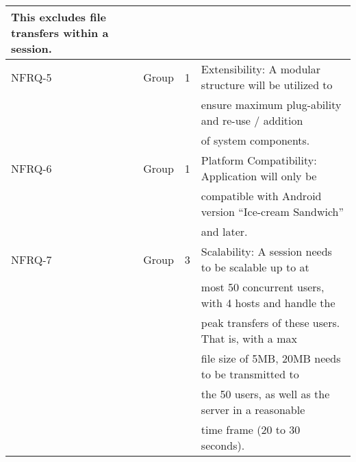 \documentclass[12pt]{article}
\begin{document}
\begin{center}
\begin{tabular}[h]{|l|l|l|l|}
					 This excludes file transfers within a session. \\
\hline
NFRQ-5 & Group & 1 & Extensibility: A modular structure will be utilized to\\ & & & 
					 ensure maximum plug-ability and re-use / addition \\ & & & 
					 of system components. \\
\hline
NFRQ-6 & Group & 1 & Platform Compatibility: Application will only be\\ & & & 
					 compatible with Android version “Ice-cream Sandwich”\\ & & & 
					  and later. \\
\hline
NFRQ-7 & Group & 3 & Scalability: A session needs to be scalable up to at \\ & & & 
					most 50 concurrent users, with 4 hosts and handle the \\ & & & 
					peak transfers of these users. That is, with a max \\ & & & 
					file size of 5MB, 20MB needs to be transmitted to \\ & & & 
					 the 50 users, as well as the server in a reasonable\\ & & & 
					  time frame (20 to 30 seconds). \\
\hline
\end{tabular} \end{center}
\end{document}
